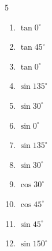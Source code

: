 \begin{multicols}{5}
\begin{enumerate}

  \item $\displaystyle \tan{0^\circ}$

        \phantom{$\displaystyle =0$}

  \item $\displaystyle \tan{45^\circ}$

        \phantom{$\displaystyle =1$}

  \item $\displaystyle \tan{0^\circ}$

        \phantom{$\displaystyle =0$}

  \item $\displaystyle \sin{135^\circ}$


  \item $\displaystyle \sin{30^\circ}$


  \item $\displaystyle \sin{0^\circ}$

        \phantom{$\displaystyle =0$}

  \item $\displaystyle \sin{135^\circ}$


  \item $\displaystyle \sin{30^\circ}$


  \item $\displaystyle \cos{30^\circ}$


  \item $\displaystyle \cos{45^\circ}$


\columnbreak %

\resetques

  \item $\displaystyle \sin{45^\circ}$


  \item $\displaystyle \sin{150^\circ}$


\end{enumerate}
\end{multicols}
